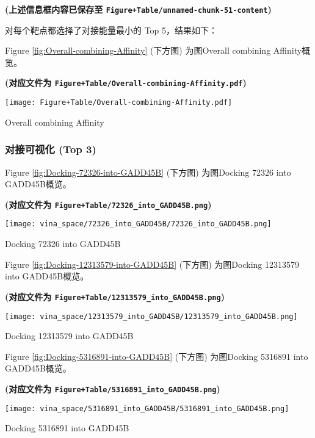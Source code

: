 \documentclass[
]{article}
\begin{document}
\textbf{(上述信息框内容已保存至 \texttt{Figure+Table/unnamed-chunk-51-content})}

对每个靶点都选择了对接能量最小的 Top 5，结果如下：

Figure \ref{fig:Overall-combining-Affinity} (下方图) 为图Overall combining Affinity概览。

\textbf{(对应文件为 \texttt{Figure+Table/Overall-combining-Affinity.pdf})}

\def\@captype{figure}
\begin{center}
\texttt{[image: Figure+Table/Overall-combining-Affinity.pdf]}
\caption{Overall combining Affinity}\label{fig:Overall-combining-Affinity}
\end{center}

\hypertarget{ux5bf9ux63a5ux53efux89c6ux5316-top-3}{%
\subsubsection{对接可视化 (Top 3)}\label{ux5bf9ux63a5ux53efux89c6ux5316-top-3}}

Figure \ref{fig:Docking-72326-into-GADD45B} (下方图) 为图Docking 72326 into GADD45B概览。

\textbf{(对应文件为 \texttt{Figure+Table/72326\_into\_GADD45B.png})}

\def\@captype{figure}
\begin{center}
\texttt{[image: vina\_space/72326\_into\_GADD45B/72326\_into\_GADD45B.png]}
\caption{Docking 72326 into GADD45B}\label{fig:Docking-72326-into-GADD45B}
\end{center}

Figure \ref{fig:Docking-12313579-into-GADD45B} (下方图) 为图Docking 12313579 into GADD45B概览。

\textbf{(对应文件为 \texttt{Figure+Table/12313579\_into\_GADD45B.png})}

\def\@captype{figure}
\begin{center}
\texttt{[image: vina\_space/12313579\_into\_GADD45B/12313579\_into\_GADD45B.png]}
\caption{Docking 12313579 into GADD45B}\label{fig:Docking-12313579-into-GADD45B}
\end{center}

Figure \ref{fig:Docking-5316891-into-GADD45B} (下方图) 为图Docking 5316891 into GADD45B概览。

\textbf{(对应文件为 \texttt{Figure+Table/5316891\_into\_GADD45B.png})}

\def\@captype{figure}
\begin{center}
\texttt{[image: vina\_space/5316891\_into\_GADD45B/5316891\_into\_GADD45B.png]}
\caption{Docking 5316891 into GADD45B}\label{fig:Docking-5316891-into-GADD45B}
\end{center}
\end{document}
